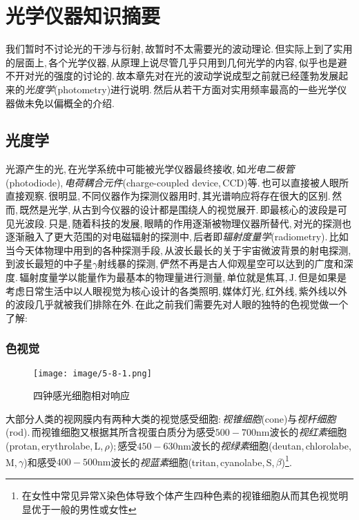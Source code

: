 \chapter{光学仪器知识摘要}


我们暂时不讨论光的干涉与衍射,\,故暂时不太需要光的波动理论.\,但实际上到了实用的层面上,\,各个光学仪器,\,从原理上说尽管几乎只用到几何光学的内容,\,似乎也是避不开对光的强度的讨论的.\,故本章先对在光的波动学说成型之前就已经蓬勃发展起来的\emph{光度学}(photometry)进行说明.\,然后从若干方面对实用频率最高的一些光学仪器做未免以偏概全的介绍.



\section{光度学}


光源产生的光,\,在光学系统中可能被光学仪器最终接收,\,如\emph{光电二极管}(photodiode),\,\emph{电荷耦合元件}(charge-coupled device,\,CCD)等.\,也可以直接被人眼所直接观察.\,很明显,\,不同仪器作为探测仪器用时,\,其光谱响应将存在很大的区别.\,然而,\,既然是光学,\,从古到今仪器的设计都是围绕人的视觉展开.\,即最核心的波段是可见光波段.\,只是,\,随着科技的发展,\,眼睛的作用逐渐被物理仪器所替代,\,对光的探测也逐渐融入了更大范围的对电磁辐射的探测中,\,后者即\emph{辐射度量学}(radiometry).\,比如当今天体物理中用到的各种探测手段,\,从波长最长的关于宇宙微波背景的射电探测,\,到波长最短的中子星$\gamma$射线暴的探测,\,俨然不再是古人仰观星空可以达到的广度和深度.\,辐射度量学以能量作为最基本的物理量进行测量,\,单位就是焦耳,\,$\mathrm{J}$.\,但是如果是考虑日常生活中以人眼视觉为核心设计的各类照明,\,媒体灯光,\,红外线,\,紫外线以外的波段几乎就被我们排除在外.\,在此之前我们需要先对人眼的独特的色视觉做一个了解:

\subsection{色视觉}
\begin{wrapfigure}[10]{o}[-10pt]{8cm}
\centering
\texttt{[image: image/5-8-1.png]}
\caption{四钟感光细胞相对响应}
\end{wrapfigure}
大部分人类的视网膜内有两种大类的视觉感受细胞:\,\emph{视锥细胞}(cone)与\emph{视杆细胞}(rod).\,而视锥细胞又根据其所含视蛋白质分为感受$500-700\mathrm{nm}$波长的\emph{视红素}细胞(protan,\,erythrolabe,\,L,\,$\rho$);\,感受$450-630\mathrm{nm}$波长的\emph{视绿素}细胞(deutan,\,chlorolabe,\,M,\,$\gamma$)和感受$400-500\mathrm{nm}$波长的\emph{视蓝素}细胞(tritan,\,cyanolabe,\,S,\,$\beta$)\footnote{在女性中常见异常X染色体导致个体产生四种色素的视锥细胞从而其色视觉明显优于一般的男性或女性}.\,





